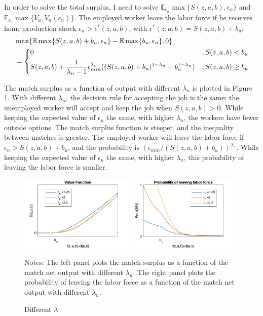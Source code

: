\documentclass[12pt]{article}
\newcommand{\E}{\mathbb{E}}
\newcommand{\1}{\mathbb{1}}
\begin{document}
In order to solve the total surplus, I need to solve $\E_{\epsilon_n}\max\{S(z,a,b),\epsilon_n\}$ and $\E_{\epsilon_n}\max\{V_u,V_n(\epsilon_n)\}$. The employed worker leave the labor force if he receives home production shock $\epsilon_n>\epsilon^*(z,a,b)$, with $\epsilon^*(z,a,b) = S(z,a,b)+b_u$. 
\begin{align*}
&\max\{\E\max\{S(z,a,b)+b_u,\epsilon_n\}-\E\max\{b_u,\epsilon_n\},0 \}   \\
&= \begin{dcases}
0 & ,S(z,a,b) < b_u \\
S(z,a,b) +\frac{1}{\lambda_n-1}\epsilon_{min}^{\lambda_n}((S(z,a,b)+b_u)^{1-\lambda_n}-b_u^{1-\lambda_n}) & ,S(z,a,b)\geq b_u 
\end{dcases}
\end{align*}	

The match surplus as a function of output with different $\lambda_n$ is plotted in Figure \ref{Analytical2}. With different $\lambda_n$, the decision rule for accepting the job is the same; the unemployed worker will accept and keep the job when $S(z,a,b)>0$. While keeping the expected value of $\epsilon_n$ the same, with higher $\lambda_n$, the workers have fewer outside options. The match surplus function is steeper, and the inequality between matches is greater. The employed worker will leave the labor force if $\epsilon_n>S(z,a,b)+b_u$, and the probability is $(\epsilon_{min}/(S(z,a,b)+b_u))^{\lambda_n}$.  While keeping the expected value of $\epsilon_n$ the same, with higher $\lambda_n$, this probability of leaving the labor force is smaller. \\
\begin{figure}[h!]
\begin{center}
\includegraphics[width=0.48\textwidth]{Analytical2_1}
\includegraphics[width=0.48\textwidth]{Analytical2_2}
\caption{Different $\lambda$}
\label{Analytical2}
\end{center}
{\scriptsize Notes: The left panel plots the match surplus as a function of the match net output with different $\lambda_n$. The right panel plots the probability of leaving the labor force as a function of the match net output with different $\lambda_n$.} 
\end{figure}
\end{document}

